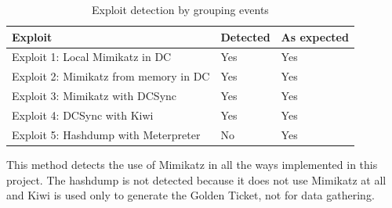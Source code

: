\begin{table}[H]
	\centering
	\begin{tabular}{|l|l|l|}
		\hline
		\rowcolor{gray!30}
		Exploit & Detected & As expected \\ \hline
		Exploit 1: Local Mimikatz in DC& \cellcolor{green!60}Yes& \cellcolor{green!60}Yes\\ \hline
		Exploit 2: Mimikatz from memory in DC& \cellcolor{green!60}Yes& \cellcolor{green!60}Yes\\ \hline
		Exploit 3: Mimikatz with DCSync& \cellcolor{green!60}Yes& \cellcolor{green!60}Yes\\ \hline
		Exploit 4: DCSync with Kiwi& \cellcolor{green!60}Yes& \cellcolor{green!60}Yes\\ \hline
		Exploit 5: Hashdump with Meterpreter& \cellcolor{red!60}No& \cellcolor{green!60}Yes\\ \hline
	\end{tabular}
	\caption{Exploit detection by grouping events}
\end{table}
This method detects the use of Mimikatz in all the ways implemented in this project. The hashdump is not detected because it does not use Mimikatz at all and Kiwi is used only to generate the Golden Ticket, not for data gathering.

